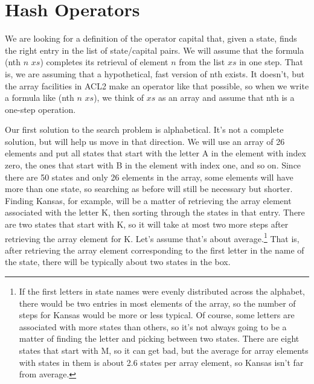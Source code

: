 \section{Hash Operators}

We are looking for a definition of the operator
\textsf{capital} that, given a state, finds the right entry
in the list of state/capital pairs.
We will assume that the formula \textsf{(nth} $n$ $xs$\textsf{)}
completes its retrieval of element $n$ from the list $xs$
in one step. That is, we are assuming that a hypothetical,
fast version of \textsf{nth} exists. It doesn't, but the
array facilities in ACL2 make an operator like that possible,
so when we write a formula like
\textsf{(nth} $n$ $xs$\textsf{)},
we think of $xs$ as an array and assume that
\textsf{nth} is a one-step operation.

Our first solution to the search problem is alphabetical.
It's not a complete solution, but will help us move in that direction.
We will use an array of 26 elements
and put all states that start with the letter A in
the element with index zero,
the ones that start with B in the element with index one, and so on.
Since there are 50 states and only
26 elements in the array, some elements will have more than one state,
so searching as before will still be necessary but shorter.
Finding Kansas, for example, will be
a matter of retrieving the array element associated with
the letter K, then sorting through the states in that entry.
There are two states that start with K,
so it will take at most two more steps after retrieving
the array element for K.  Let's assume that's about
average.\footnote{If the first letters in state names
were evenly distributed across the alphabet, there would be
two entries in most elements of the array, so the number of steps
for Kansas would be more or less typical.
Of course, some letters are associated with more states than
others, so it's not always going to be a matter of finding
the letter and picking between two states. There are eight
states that start with M, so it can get bad,
but the average for array elements with states in them
is about 2.6 states per array element, so
Kansas isn't far from average.}
That is, after retrieving the array element corresponding to
the first letter in the name of the state, there will
be typically about two states in the box.

